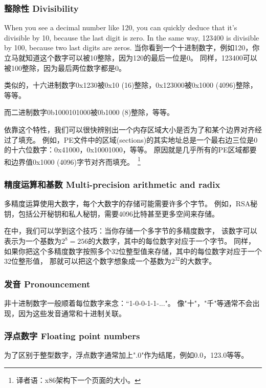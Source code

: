 \documentclass[UTF8,nofonts]{ctexart}
\begin{document}
\subsubsection{整除性 Divisibility}

When you see a decimal number like 120, you can quickly deduce that it's divisible by 10, because the last digit is zero.
In the same way, 123400 is divisible by 100, because two last digits are zeros.
当你看到一个十进制数字，例如120，你立马就知道这个数字可以被10整除，因为120的最后一位是0。
同样，123400可以被100整除，因为最后两位数字都是0。

类似的，十六进制数字0x1230被0x10 (16)整除，0x123000被0x1000 (4096)整除，等等。

而二进制数字0b1000101000被0b1000 (8)整除，等等。

依靠这个特性，我们可以很快辨别出一个内存区域大小是否为了和某个边界对齐经过了填充。
例如，\ac{PE}文件中的区域(sections)的其实地址总是一个最右边三位是0的十六位数字：0x41000，0x10001000，等等。
原因就是几乎所有的\ac{PE}区域都要和边界值0x1000 (4096)字节对齐而填充。~\footnote{译者语：x86架构下一个页面的大小。}

\subsubsection{精度运算和基数 Multi-precision arithmetic and radix}

多精度运算使用大数字，每个大数字的存储可能需要许多个字节。
例如，RSA秘钥，包括公开秘钥和私人秘钥，需要4096比特甚至更多空间来存储。

在中，我们可以学到这个技巧：当你存储一个多字节的多精度数字，
该数字可以表示为一个基数为$2^8=256$的大数字，其中的每位数字对应于一个字节。
同样，如果你把这个多精度数字按照多个32位整型值来存储，其中的每位数字对应于一个32位整形值，
那就可以把这个数字想象成一个基数为$2^{32}$的大数字。

\subsubsection{发音 Pronouncement}

非十进制数字一般顺着每位数字来念：“1-0-0-1-1-..."。
像"十"，"千"等通常不会出现，因为这些发音通常和十进制关联。

\subsubsection{浮点数字 Floating point numbers}

为了区别于整型数字，浮点数字通常加上".0"作为结尾，例如0.0，123.0等等。
\end{document}
